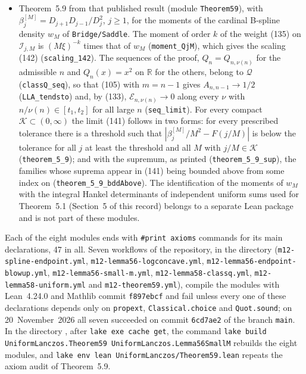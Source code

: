 \documentclass[11pt,a4paper]{article}
\newcommand{\R}{https://github.com/ralfanop/Certifications_Eulerian_polar-curve_computations}
\newcommand{\dir}[1]{\href{\R/tree/main/#1}{\texttt{\detokenize{#1}}}}
\newcommand{\eq}[1]{(#1)}
\begin{document}
\begin{itemize}
\item Theorem~5.9 from that published result (module \texttt{Theorem59}), with $\beta_j^{[M]}=D_{j+1}D_{j-1}/D_j^2$, $j\geq1$, for the moments of the cardinal B-spline density $w_M$ of \texttt{Bridge/Saddle}. The moment of order $k$ of the weight \eq{135} on $\mathcal I_{j,M}$ is $(M\xi)^{-k}$ times that of $w_M$ (\texttt{moment\_QjM}), which gives the scaling \eq{142} (\texttt{scaling\_142}). The sequences of the proof, $Q_n=Q_{n,\nu(n)}$ for the admissible $n$ and $Q_n(x)=x^2$ on $\mathbb R$ for the others, belong to $\mathcal Q$ (\texttt{classQ\_seq}), so that \eq{105} with $m=n-1$ gives $A_{n,n-1}\to1/2$ (\texttt{LLA\_tendsto}) and, by \eq{133}, $\mathcal E_{n,\nu(n)}\to0$ along every $\nu$ with $n/\nu(n)\in[t_1,t_2]$ for all large $n$ (\texttt{seq\_limit}). For every compact $\mathcal K\subset(0,\infty)$ the limit \eq{141} follows in two forms: for every prescribed tolerance there is a threshold such that $|\beta_j^{[M]}/M^2-F(j/M)|$ is below the tolerance for all $j$ at least the threshold and all $M$ with $j/M\in\mathcal K$ (\texttt{theorem\_5\_9}); and with the supremum, as printed (\texttt{theorem\_5\_9\_sup}), the families whose suprema appear in \eq{141} being bounded above from some index on (\texttt{theorem\_5\_9\_bddAbove}). The identification of the moments of $w_M$ with the integral Hankel determinants of independent uniform sums used for Theorem~5.1 (Section~5 of this record) belongs to a separate Lean package and is not part of these modules.
\end{itemize}
{\raggedright Each of the eight modules ends with \texttt{\#print axioms} commands for its main declarations, 47 in all. Seven workflows of the repository, in the directory \dir{.github/workflows} (\texttt{m12-spline-endpoint.yml}, \texttt{m12-lemma56-logconcave.yml}, \texttt{m12-lemma56-endpoint-blowup.yml}, \texttt{m12-lemma56-small-m.yml}, \texttt{m12-lemma58-classq.yml}, \texttt{m12-lemma58-uniform.yml} and \texttt{m12-theorem59.yml}), compile the modules with Lean~4.24.0 and Mathlib commit \texttt{f897ebcf} and fail unless every one of these declarations depends only on \texttt{propext}, \texttt{Classical.choice} and \texttt{Quot.sound}; on 20~November~2026 all seven succeeded on commit \texttt{6cd7ae2} of the branch \texttt{main}. In the directory \dir{lean/EulerianGrothendieck}, after \texttt{lake exe cache get}, the command \texttt{lake build UniformLanczos.Theorem59 UniformLanczos.Lemma56SmallM} rebuilds the eight modules, and \texttt{lake env lean UniformLanczos/Theorem59.lean} repeats the axiom audit of Theorem~5.9.\par}
\end{document}
